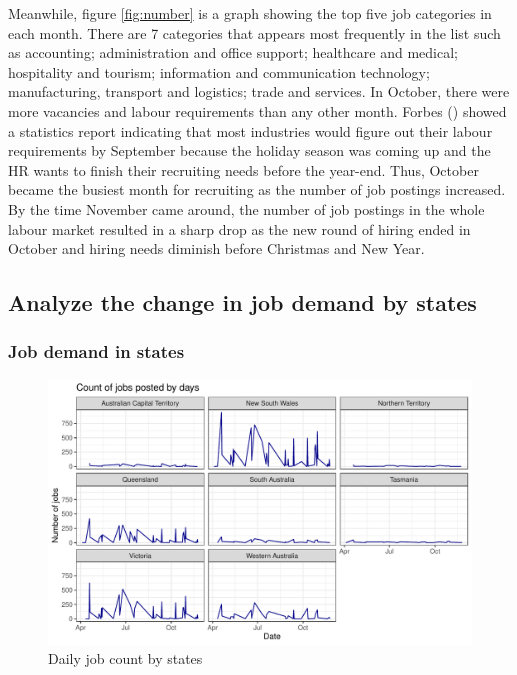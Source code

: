 \documentclass[11pt,a4paper,]{article}
\begin{document}
Meanwhile, figure \ref{fig:number} is a graph showing the top five job categories in each month. There are 7 categories that appears most frequently in the list such as accounting; administration and office support; healthcare and medical; hospitality and tourism; information and communication technology; manufacturing, transport and logistics; trade and services. In October, there were more vacancies and labour requirements than any other month. Forbes (\textcite{whitehead}) showed a statistics report indicating that most industries would figure out their labour requirements by September because the holiday season was coming up and the HR wants to finish their recruiting needs before the year-end. Thus, October became the busiest month for recruiting as the number of job postings increased. By the time November came around, the number of job postings in the whole labour market resulted in a sharp drop as the new round of hiring ended in October and hiring needs diminish before Christmas and New Year.

\hypertarget{analyze-the-change-in-job-demand-by-states}{%
\subsection{Analyze the change in job demand by states}\label{analyze-the-change-in-job-demand-by-states}}

\hypertarget{job-demand-in-states}{%
\subsubsection{Job demand in states}\label{job-demand-in-states}}

\begin{figure}

{\centering \includegraphics{Team_JHDP_Assignment4_files/figure-latex/state-demand-1} 

}

\caption{Daily job count by states}\label{fig:state-demand}
\end{figure}
\end{document}
